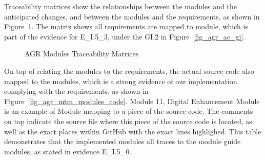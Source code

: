 Traceability matrices show the relationships between the modules and the anticipated changes, and between the modules and the requirements, as shown in Figure~\ref{fig_agr_mtm}. The matrix shows all requirements are mapped to module, which is part of the evidence for E\_I.5\_3, under the GI.2 in Figure~\ref{fig_agr_ac_gi}.

\begin{figure}[H]
    \centering
    \caption[AGR Modules Traceability Matrices]{AGR Modules Traceability Matrices}
    \label{fig_agr_mtm}
\end{figure}

On top of relating the modules to the requirements, the actual source code also mapped to the modules, which is a strong evidence of our implementation complying with the requirements, as shown in Figure~\ref{fig_agr_mtm_modules_code}. Module 11, Digital Enhancement Module is an example of Module mapping to a piece of the source code. The comments on top indicate the source file where this piece of the source code is located, as well as the exact places within GitHub with the exact lines highlighed. This table demonstrates that the implemented modules all traces to the module guide modules, as stated in evidence E\_I.5\_0.

